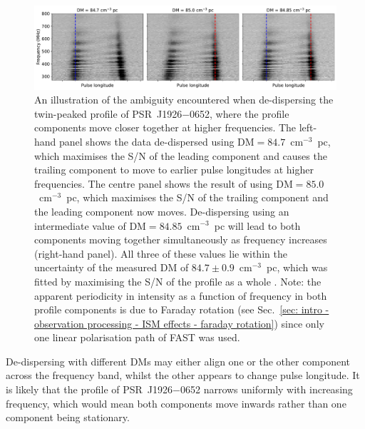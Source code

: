 \begin{figure}
    \begin{center}
        \includegraphics[width=1.0\textwidth]{Figures/J1926/dedispersion_real_data}
        \caption[Ambiguity in de-dispersion of a multi-component pulse profile]{An illustration of the ambiguity encountered when de-dispersing the twin-peaked profile of PSR~J1926$-$0652, where the profile components move closer together at higher frequencies. The left-hand panel shows the data de-dispersed using DM$=84.7$~cm$^{-3}$~pc, which maximises the S/N of the leading component and causes the trailing component to move to earlier pulse longitudes at higher frequencies. The centre panel shows the result of using  DM$=85.0$~cm$^{-3}$~pc, which maximises the S/N of the trailing component and the leading component now moves. De-dispersing using an intermediate value of DM$=84.85$~cm$^{-3}$~pc will lead to both components moving together simultaneously as frequency increases (right-hand panel). All three of these values lie within the uncertainty of the measured DM of $84.7 \pm 0.9$~cm$^{-3}$~pc, which was fitted by maximising the S/N of the profile as a whole \citep{ZLH+2019}. Note: the apparent periodicity in intensity as a function of frequency in both profile components is due to Faraday rotation (see Sec.~\ref{sec: intro - observation processing - ISM effects - faraday rotation}) since only one linear polarisation path of FAST was used.}
        \label{fig: J1926 - dedispersion}
    \end{center}
\end{figure}
De-dispersing with different DMs may either align one or the other component across the frequency band, whilst the other appears to change pulse longitude. It is likely that the profile of PSR~J1926$-$0652 narrows uniformly with increasing frequency, which would mean both components move inwards rather than one component being stationary.

